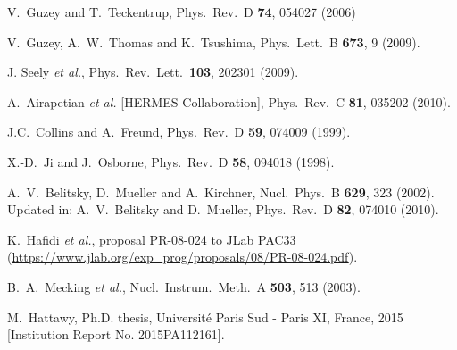 \documentclass[twocolumn,nofootinbib,prl,superscriptaddress,secnumarabic,amssymb,nobibnotes,aps,floatfix]{revtex4}
\begin{document}
\begin{thebibliography}{99}
 V.~Guzey and T.~Teckentrup, Phys.\ Rev.\ D {\bf 74}, 
   054027 (2006)

 V.~Guzey, A.~W.~Thomas and K.~Tsushima,
  Phys.\ Lett.\ B {\bf 673}, 9 (2009).

J. Seely {\it et al.}, Phys.\ Rev.\ Lett.\ {\bf 103}, 202301 (2009).

 A.~Airapetian {\it et al.} [HERMES Collaboration],
Phys.\ Rev.\ C {\bf 81}, 035202 (2010).

J.C.~Collins and A.~Freund, Phys.\ Rev.\ D {\bf 59}, 074009 (1999).

   X.-D.~Ji and J.~Osborne, Phys.\ Rev.\ D {\bf 58}, 094018 (1998).

A.~V.~Belitsky, D.~Mueller and A.~Kirchner, Nucl.\ Phys.\ B {\bf 629}, 323 
(2002). Updated in: A.~V.~Belitsky and D.~Mueller, Phys.\ Rev.\ D {\bf 82}, 
074010 (2010).


 K.~Hafidi {\it et al.},
   proposal PR-08-024 to JLab PAC33 
   (\url{https://www.jlab.org/exp_prog/proposals/08/PR-08-024.pdf}).

 B.~A.~Mecking {\it et al.},
   Nucl.\ Instrum.\ Meth.\ A {\bf 503}, 513 (2003).

M.~Hattawy, Ph.D. thesis, Universit{\'e} Paris Sud - Paris XI, France, 2015 
[Institution Report No. 2015PA112161].


\end{thebibliography}
\end{document}
